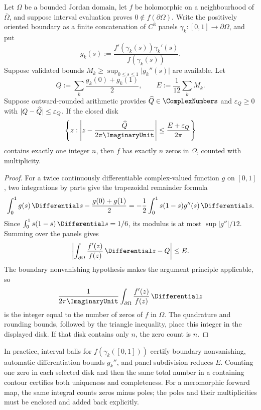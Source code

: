 \begin{theorem}
\label{thm:validated-argument-principle}
Let \(\Omega\) be a bounded Jordan domain, let \(f\) be holomorphic on a
neighbourhood of \(\overline\Omega\), and suppose interval evaluation proves
\(0\notin f(\partial\Omega)\).  Write the positively oriented boundary as a
finite concatenation of \(C^3\) panels
\(\gamma_k:[0,1]\to\partial\Omega\), and put
\[
 g_k(s):=\frac{f'(\gamma_k(s))\gamma_k'(s)}{f(\gamma_k(s))}.
\]
Suppose validated bounds
\(M_k\ge\sup_{0\le s\le1}\lvert g_k''(s)\rvert\) are available.  Let
\[
 Q:=\sum_k\frac{g_k(0)+g_k(1)}2,
 \qquad
 E:=\frac1{12}\sum_kM_k.
\]
Suppose outward-rounded arithmetic provides
\(\CertifiedEnclosureCenter{Q}\in\ComplexNumbers\) and \(\varepsilon_Q\ge0\) with
\(\lvert Q-\widehat{Q}\rvert\le\varepsilon_Q\).  If the closed disk
\[
\left\{z:\left\lvert z-\frac{\CertifiedEnclosureCenter{Q}}{2\pi\ImaginaryUnit}\right\rvert
       \le\frac{E+\varepsilon_Q}{2\pi}\right\}
\]
contains exactly one integer \(n\), then \(f\) has exactly \(n\) zeros in
\(\Omega\), counted with multiplicity.
\end{theorem}

\begin{proof}
For a twice continuously differentiable complex-valued function \(g\) on
\([0,1]\), two integrations by parts give the trapezoidal remainder formula
\[
 \int_0^1g(s)\,\Differential s-\frac{g(0)+g(1)}2
 =-\frac12\int_0^1s(1-s)g''(s)\,\Differential s.
\]
Since \(\int_0^1s(1-s)\,\Differential s=1/6\), its modulus is at most
\(\sup\lvert g''\rvert/12\).  Summing over the panels gives
\[
 \left\lvert\int_{\partial\Omega}\frac{f'(z)}{f(z)}\,\Differential z-Q\right\rvert
 \le E.
\]
The boundary nonvanishing hypothesis makes the argument principle applicable,
so
\[
 \frac1{2\pi\ImaginaryUnit}\int_{\partial\Omega}\frac{f'(z)}{f(z)}\,\Differential z
\]
is the integer equal to the number of zeros of \(f\) in \(\Omega\).  The
quadrature and rounding bounds, followed by the triangle inequality, place
this integer in the displayed disk.  If that disk contains only \(n\), the
zero count is \(n\).
\end{proof}

In practice, interval balls for \(f(\gamma_k([0,1]))\) certify boundary
nonvanishing, automatic differentiation bounds \(g_k''\), and panel
subdivision reduces \(E\).  Counting one zero in each selected disk and then
the same total number in a containing contour certifies both uniqueness and
completeness.  For a meromorphic forward map, the same integral counts zeros
minus poles; the poles and their multiplicities must be enclosed and added
back explicitly.

